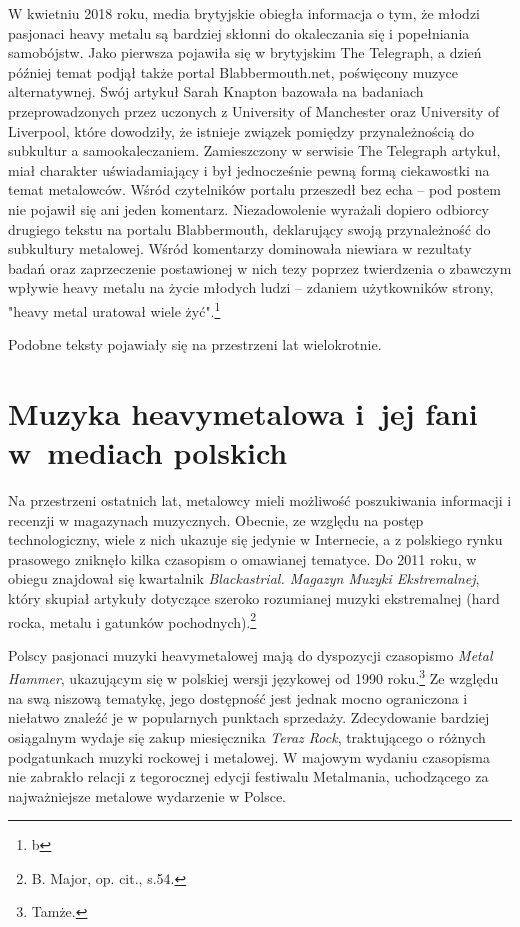 \documentclass[12pt, a4paper, titlepage]{report}
\begin{document}
W kwietniu 2018 roku, media brytyjskie obiegła informacja o tym, że młodzi pasjonaci heavy metalu są bardziej skłonni do okaleczania się i popełniania samobójstw. Jako pierwsza pojawiła się w brytyjskim The Telegraph, a dzień później temat podjął także portal Blabbermouth.net, poświęcony muzyce alternatywnej. Swój artykuł Sarah Knapton bazowała na badaniach przeprowadzonych przez uczonych z University of Manchester oraz University of Liverpool, które dowodziły, że istnieje związek pomiędzy przynależnością do subkultur a samookaleczaniem. Zamieszczony w serwisie The Telegraph artykuł, miał charakter uświadamiający i był jednocześnie pewną formą ciekawostki na temat metalowców. Wśród czytelników portalu przeszedł bez echa -- pod postem nie pojawił się ani jeden komentarz. Niezadowolenie wyrażali dopiero odbiorcy drugiego tekstu na portalu Blabbermouth, deklarujący swoją przynależność do subkultury metalowej. Wśród komentarzy dominowała niewiara w rezultaty badań oraz zaprzeczenie postawionej w nich tezy poprzez twierdzenia o zbawczym wpływie heavy metalu na życie młodych ludzi -- zdaniem użytkowników strony, "heavy metal uratował wiele żyć".\footnote{b}

Podobne teksty pojawiały się na przestrzeni lat wielokrotnie. 

\section{Muzyka heavymetalowa i~jej fani w~mediach polskich}
Na przestrzeni ostatnich lat, metalowcy mieli możliwość poszukiwania informacji i recenzji w magazynach muzycznych. Obecnie, ze względu na postęp technologiczny, wiele z nich ukazuje się jedynie w Internecie, a z polskiego rynku prasowego zniknęło kilka czasopism o omawianej tematyce. Do 2011 roku, w obiegu znajdował się kwartalnik \textit{Blackastrial. Magazyn Muzyki Ekstremalnej}, który skupiał artykuły dotyczące szeroko rozumianej muzyki ekstremalnej (hard rocka, metalu i gatunków pochodnych).\footnote{B. Major, op. cit., s.54.}  

Polscy pasjonaci muzyki heavymetalowej mają do dyspozycji czasopismo \textit{Metal Hammer}, ukazującym się w polskiej wersji językowej od 1990 roku.\footnote{Tamże.} Ze względu na swą niszową tematykę, jego dostępność jest jednak mocno ograniczona i niełatwo znaleźć je w popularnych punktach sprzedaży. Zdecydowanie bardziej osiągalnym wydaje się zakup miesięcznika \textit{Teraz Rock}, traktującego o różnych podgatunkach muzyki rockowej i metalowej. W majowym wydaniu czasopisma nie zabrakło relacji z tegorocznej edycji festiwalu Metalmania, uchodzącego za najważniejsze metalowe wydarzenie w Polsce.
\end{document}
